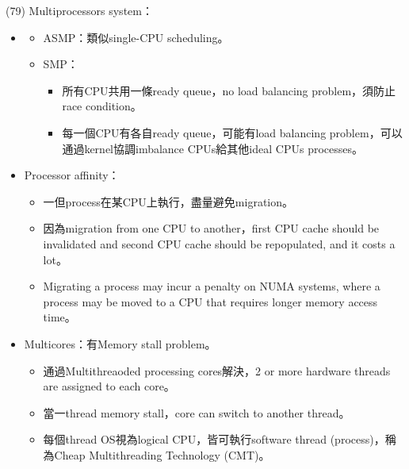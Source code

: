 \begin{theorem}{(79)} Multiprocessors system：\begin{itemize}
        \item \begin{itemize}
            \item ASMP：類似single-CPU scheduling。
            \item SMP：\begin{itemize}
                \item 所有CPU共用一條ready queue，no load balancing problem，須防止race condition。
                \item 每一個CPU有各自ready queue，可能有load balancing problem，可以通過kernel協調imbalance CPUs給其他ideal CPUs processes。
            \end{itemize}
        \end{itemize}
        \item Processor affinity：\begin{itemize}
            \item 一但process在某CPU上執行，盡量避免migration。
            \item 因為migration from one CPU to another，first CPU cache should be invalidated and second CPU cache should be repopulated, and it costs a lot。
            \item Migrating a process may incur a penalty on NUMA systems, where a process may be moved to a CPU that requires longer memory access time。
        \end{itemize}
        \item Multicores：有Memory stall problem。\begin{itemize}
            \item 通過Multithreaoded processing cores解決，2 or more hardware threads are assigned to each core。
            \item 當一thread memory stall，core can switch to another thread。
            \item 每個thread OS視為logical CPU，皆可執行software thread (process)，稱為Cheap Multithreading Technology (CMT)。
        \end{itemize}
    \end{itemize}
\end{theorem}

